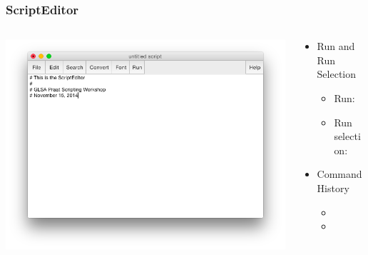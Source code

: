 \documentclass[handout]{beamer}
\begin{document}
\begin{frame}[fragile]
\frametitle{ScriptEditor}
    
\begin{columns}[]
  \begin{column}{0.5\textwidth}
    \includegraphics[width=\textwidth]{graphics/scripteditor.png}
  \end{column}

  \begin{column}{0.5\textwidth}
    \begin{itemize}
        \item <1-> Run and Run Selection 
        \begin{itemize}
            \item Run: 
            \item Run selection: 
        \end{itemize}
        \item <2-> Command History
        \begin{itemize}
            \item {}
            \item {}
        \end{itemize}
    \end{itemize}
  \end{column}
\end{columns}

\end{frame}

\end{document}

